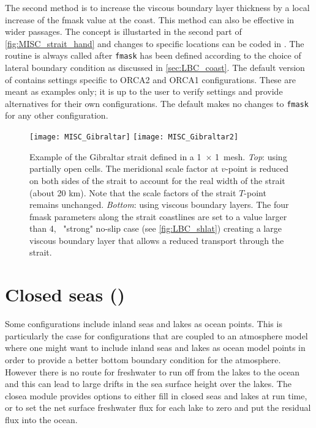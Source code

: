 \documentclass[../main/NEMO_manual]{subfiles}
\begin{document}
The second method is to increase the viscous boundary layer thickness by a local increase
of the fmask value at the coast. This method can also be effective in wider passages.  The
concept is illustarted in the second part of  \autoref{fig:MISC_strait_hand} and changes
to specific locations can be coded in . The 
routine is always called after \texttt{fmask} has been defined according to the choice of
lateral boundary condition as discussed in \autoref{sec:LBC_coast}. The default version of
 contains settings specific to ORCA2 and ORCA1 configurations. These are
meant as examples only; it is up to the user to verify settings and provide alternatives
for their own configurations. The default  makes no changes to
\texttt{fmask} for any other configuration.

\begin{figure}[!tbp]
  \centering
  \texttt{[image: MISC\_Gibraltar]}
  \texttt{[image: MISC\_Gibraltar2]}
  \caption[Two methods to defined the Gibraltar strait]{
    Example of the Gibraltar strait defined in a 1\deg\ $\times$ 1\deg\ mesh.
    \textit{Top}: using partially open cells.
    The meridional scale factor at $v$-point is reduced on both sides of the strait to
    account for the real width of the strait (about 20 km).
    Note that the scale factors of the strait $T$-point remains unchanged.
    \textit{Bottom}: using viscous boundary layers.
    The four fmask parameters along the strait coastlines are set to a value larger than 4,
    \ie\ "strong" no-slip case (see \autoref{fig:LBC_shlat}) creating a large viscous boundary layer
    that allows a reduced transport through the strait.}
  \label{fig:MISC_strait_hand}
\end{figure}

\section[Closed seas (\textit{closea.F90})]{Closed seas (\protect{})}
\label{sec:MISC_closea}

\begin{listing}
  \caption{}
  \label{lst:namclo}
\end{listing}

Some configurations include inland seas and lakes as ocean
points. This is particularly the case for configurations that are
coupled to an atmosphere model where one might want to include inland
seas and lakes as ocean model points in order to provide a better
bottom boundary condition for the atmosphere. However there is no
route for freshwater to run off from the lakes to the ocean and this
can lead to large drifts in the sea surface height over the lakes. The
closea module provides options to either fill in closed seas and lakes
at run time, or to set the net surface freshwater flux for each lake
to zero and put the residual flux into the ocean.
\end{document}
